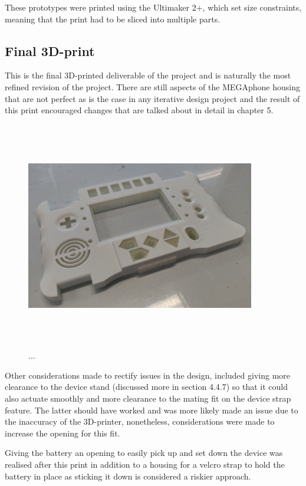 These prototypes were printed using the Ultimaker 2+, which set size constraints, meaning that the print had to be sliced into multiple parts.

\subsection{Final 3D-print}

This is the final 3D-printed deliverable of the project and is naturally the most refined revision of the project. 
There are still aspects of the MEGAphone housing that are not perfect as is the case in any iterative design project and the result of this print encouraged changes that are talked about in detail in chapter 5.

\begin{figure} [h]
    \centering
    \includegraphics[width=10cm,height=10cm,keepaspectratio]{Figures/topwatersupport.jpg}
    \caption{...}
    \label{fig:thirdtop}
\end{figure}

Other considerations made to rectify issues in the design, included giving more clearance to the device stand (discussed more in section 4.4.7) so that it could also actuate smoothly and more clearance to the mating fit on the device strap feature.
The latter should have worked and was more likely made an issue due to the inaccuracy of the 3D-printer, nonetheless, considerations were made to increase the opening for this fit.

Giving the battery an opening to easily pick up and set down the device was realised after this print in addition to a housing for a velcro strap to hold the battery in place as sticking it down is considered a riskier approach.

